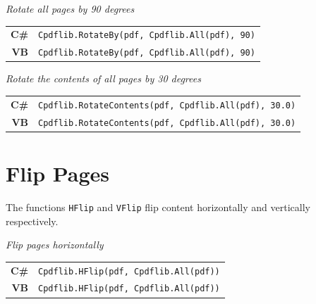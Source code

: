\documentclass[a4paper]{memoir}
\begin{document}
\begin{framed}
\noindent\textit{Rotate all pages by 90 degrees}

\vspace{2mm}
\noindent\begin{tabular}{rl}
\small\sffamily\textbf{C\#} &
\begin{minipage}{4in}
\small\verb!Cpdflib.RotateBy(pdf, Cpdflib.All(pdf), 90)!
\end{minipage}\\[5mm]
\small\sffamily\textbf{VB} &
\begin{minipage}{4in}
\small\verb!Cpdflib.RotateBy(pdf, Cpdflib.All(pdf), 90)!
\end{minipage}\\[5mm]
\end{tabular}
\end{framed}

\begin{framed}
\noindent\textit{Rotate the contents of all pages by 30 degrees}

\vspace{2mm}
\noindent\begin{tabular}{rl}
\small\sffamily\textbf{C\#} &
\begin{minipage}{4in}
\small\verb!Cpdflib.RotateContents(pdf, Cpdflib.All(pdf), 30.0)!
\end{minipage}\\[5mm]
\small\sffamily\textbf{VB} &
\begin{minipage}{4in}
\small\verb!Cpdflib.RotateContents(pdf, Cpdflib.All(pdf), 30.0)!
\end{minipage}\\[5mm]
\end{tabular}
\end{framed}

\section{Flip Pages}
The functions \verb!HFlip! and \verb!VFlip! flip content horizontally and vertically respectively.
\begin{framed}
\noindent\textit{Flip pages horizontally}

\vspace{2mm}
\noindent\begin{tabular}{rl}
\small\sffamily\textbf{C\#} &
\begin{minipage}{4in}
\small\verb!Cpdflib.HFlip(pdf, Cpdflib.All(pdf))!
\end{minipage}\\[5mm]
\small\sffamily\textbf{VB} &
\begin{minipage}{4in}
\small\verb!Cpdflib.HFlip(pdf, Cpdflib.All(pdf))!
\end{minipage}\\[5mm]
\end{tabular}
\end{framed}
\end{document}
